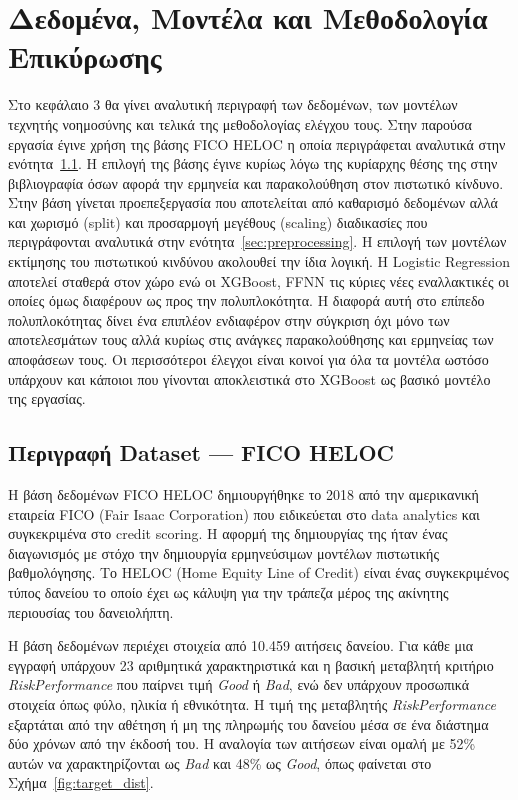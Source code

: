 \chapter{Δεδομένα, Μοντέλα και Μεθοδολογία Επικύρωσης}
\label{ch:methodology}

Στο κεφάλαιο 3 θα γίνει αναλυτική περιγραφή των δεδομένων, των μοντέλων 
τεχνητής νοημοσύνης και τελικά της μεθοδολογίας ελέγχου τους.
Στην παρούσα εργασία έγινε χρήση της βάσης FICO HELOC η οποία περιγράφεται 
αναλυτικά στην ενότητα~\ref{sec:dataset}. Η επιλογή της βάσης έγινε κυρίως 
λόγω της κυρίαρχης θέσης της στην βιβλιογραφία όσων αφορά την ερμηνεία και 
παρακολούθηση στον πιστωτικό κίνδυνο. Στην βάση γίνεται προεπεξεργασία που 
αποτελείται από καθαρισμό δεδομένων αλλά και χωρισμό (split) και προσαρμογή 
μεγέθους (scaling) διαδικασίες που περιγράφονται αναλυτικά στην 
ενότητα~\ref{sec:preprocessing}. Η επιλογή των μοντέλων εκτίμησης του 
πιστωτικού κινδύνου ακολουθεί την ίδια λογική. Η Logistic Regression αποτελεί 
σταθερά στον χώρο ενώ οι XGBoost, FFNN τις κύριες νέες εναλλακτικές οι οποίες 
όμως διαφέρουν ως προς την πολυπλοκότητα. Η διαφορά αυτή στο επίπεδο 
πολυπλοκότητας δίνει ένα επιπλέον ενδιαφέρον στην σύγκριση όχι μόνο των 
αποτελεσμάτων τους αλλά κυρίως στις ανάγκες παρακολούθησης και ερμηνείας των 
αποφάσεων τους. Οι περισσότεροι έλεγχοι είναι κοινοί για όλα τα μοντέλα 
ωστόσο υπάρχουν και κάποιοι που γίνονται αποκλειστικά στο XGBoost ως βασικό 
μοντέλο της εργασίας.

\section{Περιγραφή Dataset --- FICO HELOC}
\label{sec:dataset}

Η βάση δεδομένων FICO HELOC δημιουργήθηκε το 2018 από την αμερικανική
εταιρεία FICO (Fair Isaac Corporation) που ειδικεύεται στο data analytics
και συγκεκριμένα στο credit scoring. Η αφορμή της δημιουργίας της ήταν
ένας διαγωνισμός με στόχο την δημιουργία ερμηνεύσιμων μοντέλων
πιστωτικής βαθμολόγησης. Το HELOC (Home Equity Line of Credit) είναι
ένας συγκεκριμένος τύπος δανείου το οποίο έχει ως κάλυψη για την
τράπεζα μέρος της ακίνητης περιουσίας του δανειολήπτη.

Η βάση δεδομένων περιέχει στοιχεία από 10.459 αιτήσεις δανείου. Για
κάθε μια εγγραφή υπάρχουν 23 αριθμητικά χαρακτηριστικά και η βασική
μεταβλητή κριτήριο \textit{RiskPerformance} που παίρνει τιμή
\textit{Good} ή \textit{Bad}, ενώ δεν υπάρχουν προσωπικά στοιχεία όπως
φύλο, ηλικία ή εθνικότητα. Η τιμή της μεταβλητής \textit{RiskPerformance}
εξαρτάται από την αθέτηση ή μη της πληρωμής του δανείου μέσα σε ένα
διάστημα δύο χρόνων από την έκδοσή του. Η αναλογία των αιτήσεων είναι
ομαλή με 52\% αυτών να χαρακτηρίζονται ως \textit{Bad} και 48\% ως
\textit{Good}, όπως φαίνεται στο Σχήμα~\ref{fig:target_dist}.


